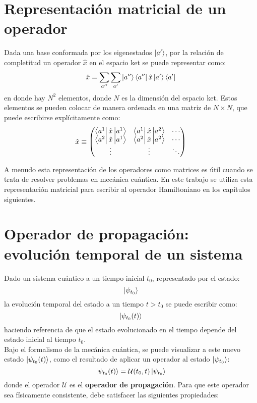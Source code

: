 \section{Representación matricial de un operador}
Dada una base conformada por los eigenestados $\ket{a'}$, por la relación de completitud un operador $\hat{x}$ en el espacio ket se puede representar como:
\begin{equation}
  \label{eq:xhat}
  \hat{x} = \sum_{a''}\sum_{a'}\ket{a''}\bra{a''}\hat{x}\ket{a'}\bra{a'}
\end{equation}
en donde hay $N^2$ elementos, donde $N$ es la dimensión del espacio ket. Estos elementos se pueden colocar de manera ordenada en una matriz de $N \times N$, que puede escribirse explícitamente como:
\begin{equation}
\hat{x}\equiv
\begin{pmatrix}
  \bra{a^1}\hat{x}\ket{a^1} & \bra{a^1}\hat{x}\ket{a^2} & \cdots \\
  \bra{a^2}\hat{x}\ket{a^1} & \bra{a^2}\hat{x}\ket{a^2} & \cdots \\
  \vdots & \vdots & \ddots
\end{pmatrix}
\label{eq:xmatrix}
\end{equation}

A menudo esta representación de los operadores como matrices es útil cuando se trata de resolver problemas en mecánica cuántica. En este trabajo se utiliza esta representación matricial para escribir al operador Hamiltoniano en los capítulos siguientes. 

\section{Operador de propagación: evolución temporal de un sistema}

Dado un sistema cuántico a un tiempo inicial $t_0$, representado por el estado: $$\ket{\psi_{t_0}}$$ la evolución temporal del estado a un tiempo $t>t_0$ se puede escribir como: $$\ket{\psi_{t_0}(t)}$$ haciendo referencia de que el estado evolucionado en el tiempo depende del estado inicial al tiempo $t_0$.
\\
Bajo el formalismo de la mecánica cuántica, se puede visualizar a este nuevo estado $\ket{\psi_{t_0}(t)}$, como el resultado de aplicar un operador al estado $\ket{\psi_{t_0}}$:
$$\ket{\psi_{t_0}(t)}=\mathcal{U}(t_0,t)\ket{\psi_{t_0}}$$
donde el operador $\mathcal{U}$ es el \textbf{operador de propagación}. Para que este operador sea físicamente consistente, debe satisfacer las siguientes propiedades:

